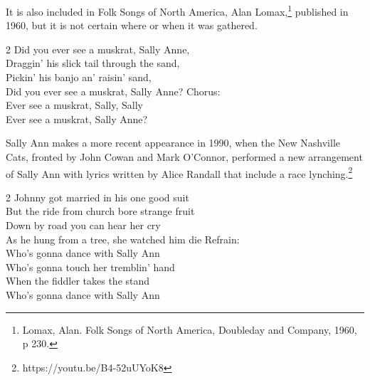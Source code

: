 \documentclass[10pt]{article}
\begin{document}
    It is also included in Folk Songs of North America, Alan
    Lomax,\footnote{Lomax, Alan. Folk Songs of North America, Doubleday
      and Company, 1960, p 230.} published in 1960, but it is not certain
    where or when it was gathered.
    
    \begin{multicols}{2}
      \noindent
      Did you ever see a muskrat, Sally Anne, \\
      Draggin' his slick tail through the sand,\\
      Pickin' his banjo an' raisin' sand,\\
      Did you ever see a muskrat, Sally Anne?
      \vfill\null
      \columnbreak
      \noindent
      Chorus: \\
      Ever see a muskrat, Sally, Sally\\
      Ever see a muskrat, Sally Anne?
    \end{multicols}
    \vspace*{-.5cm}
    Sally Ann makes a more recent appearance in 1990, when the New
    Nashville Cats, fronted by John Cowan and Mark O'Connor, performed a
    new arrangement of Sally Ann with lyrics written by Alice Randall
    that include a race lynching.\footnote{https://youtu.be/B4-52uUYoK8}
    
    \begin{multicols}{2}
      \noindent
      Johnny got married in his one good suit \\
      But the ride from church bore strange fruit\\
      Down by road you can hear her cry \\
      As he hung from a tree, she watched him die
      \vfill\null
      \columnbreak
      \noindent
      Refrain:\\
      Who's gonna dance with Sally Ann \\
      Who's gonna touch her tremblin' hand \\
      When the fiddler takes the stand \\
      Who's gonna dance with Sally Ann
    \end{multicols}
\end{document}
